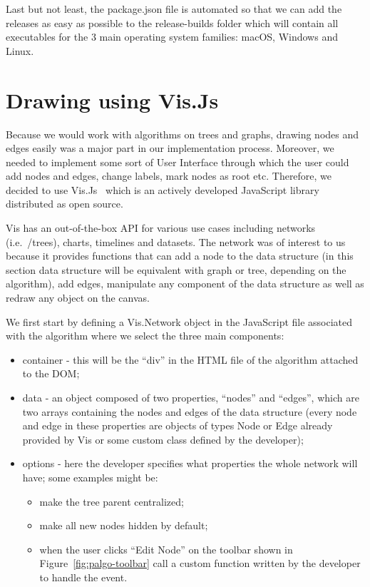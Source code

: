 \documentclass{l4proj}
\begin{document}
Last but not least, the package.json file is automated so that we can add the releases as easy as possible to the
release-builds folder which will contain all executables for the 3 main operating system families: macOS, Windows and
Linux.

\section{Drawing using Vis.Js}

Because we would work with algorithms on trees and graphs, drawing nodes and edges easily was a major part in our
implementation process. Moreover, we needed to implement some sort of User Interface through which the user could add
nodes and edges, change labels, mark nodes as root etc. Therefore, we decided to use Vis.Js~\cite{visjs} which is an
actively developed JavaScript library distributed as open source.

Vis has an out-of-the-box API for various use cases including networks (i.e.\ \graphs/trees), charts,
timelines and datasets. The network was of interest to us because it provides functions that can add a node to the
data structure (in this section data structure will be equivalent with graph or tree, depending on the algorithm), add
edges, manipulate any component of the data structure as well as redraw any object on the canvas. 

We first start by defining a Vis.Network object in the JavaScript file associated with the algorithm where we select
the three main components:

\begin{itemize}
  \item container - this will be the ``div'' in the HTML file of the algorithm attached to the DOM;
  \item data - an object composed of two properties, ``nodes'' and ``edges'', which are two arrays containing the
    nodes and edges of the data structure (every node and edge in these properties are objects of types Node or Edge
    already provided by Vis or some custom class defined by the developer);
  \item options - here the developer specifies what properties the whole network will have; some examples might be:
    \begin{itemize}
      \item make the tree parent centralized;
      \item make all new nodes hidden by default;
      \item when the user clicks ``Edit Node'' on the toolbar shown in Figure~\ref{fig:palgo-toolbar} call a custom
	function written by the developer to handle the event.
    \end{itemize}
\end{itemize}
\end{document}
